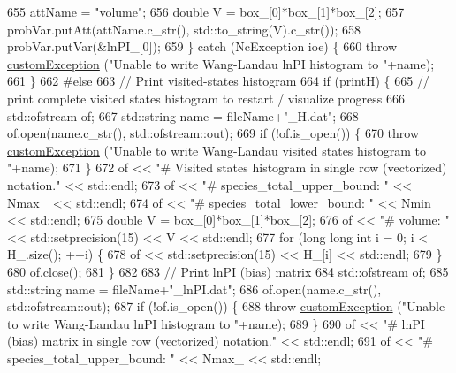 \begin{DoxyCode}
655         attName = \textcolor{stringliteral}{"volume"};
656         \textcolor{keywordtype}{double} V = box\_[0]*box\_[1]*box\_[2];
657         probVar.putAtt(attName.c\_str(), std::to\_string(V).c\_str());
658         probVar.putVar(&lnPI\_[0]);
659     \} \textcolor{keywordflow}{catch} (NcException ioe) \{
660         \textcolor{keywordflow}{throw} \hyperlink{classcustom_exception}{customException} (\textcolor{stringliteral}{"Unable to write Wang-Landau lnPI histogram to "}+name);
661     \}
662 \textcolor{preprocessor}{#else}
663 \textcolor{preprocessor}{}    \textcolor{comment}{// Print visited-states histogram}
664     \textcolor{keywordflow}{if} (printH) \{
665         \textcolor{comment}{// print complete visited states histogram to restart / visualize progress}
666         std::ofstream of;
667         std::string name = fileName+\textcolor{stringliteral}{"\_H.dat"};
668         of.open(name.c\_str(), std::ofstream::out);
669         \textcolor{keywordflow}{if} (!of.is\_open()) \{
670             \textcolor{keywordflow}{throw} \hyperlink{classcustom_exception}{customException} (\textcolor{stringliteral}{"Unable to write Wang-Landau visited states histogram to 
      "}+name);
671         \}
672         of << \textcolor{stringliteral}{"# Visited states histogram in single row (vectorized) notation."} << std::endl;
673         of << \textcolor{stringliteral}{"# species\_total\_upper\_bound: "} << Nmax\_ << std::endl;
674         of << \textcolor{stringliteral}{"# species\_total\_lower\_bound: "} << Nmin\_ << std::endl;
675         \textcolor{keywordtype}{double} V = box\_[0]*box\_[1]*box\_[2];
676         of << \textcolor{stringliteral}{"# volume: "} << std::setprecision(15) << V << std::endl;
677         \textcolor{keywordflow}{for} (\textcolor{keywordtype}{long} \textcolor{keywordtype}{long} \textcolor{keywordtype}{int} i = 0; i < H\_.size(); ++i) \{
678             of << std::setprecision(15) << H\_[i] << std::endl;
679         \}
680         of.close();
681     \}
682 
683     \textcolor{comment}{// Print lnPI (bias) matrix}
684     std::ofstream of;
685     std::string name = fileName+\textcolor{stringliteral}{"\_lnPI.dat"};
686     of.open(name.c\_str(), std::ofstream::out);
687     \textcolor{keywordflow}{if} (!of.is\_open()) \{
688         \textcolor{keywordflow}{throw} \hyperlink{classcustom_exception}{customException} (\textcolor{stringliteral}{"Unable to write Wang-Landau lnPI histogram to "}+name);
689     \}
690     of << \textcolor{stringliteral}{"# lnPI (bias) matrix in single row (vectorized) notation."} << std::endl;
691     of << \textcolor{stringliteral}{"# species\_total\_upper\_bound: "} << Nmax\_ << std::endl;

\end{DoxyCode}
